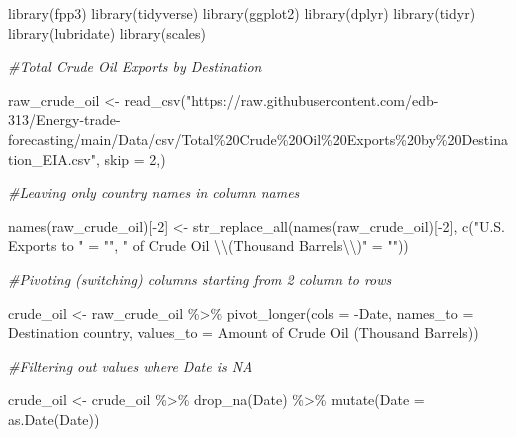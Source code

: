 \documentclass[
]{article}
\newenvironment{Shaded}{\begin{snugshade}}{\end{snugshade}}
\newcommand{\AttributeTok}[1]{\textcolor[rgb]{0.77,0.63,0.00}{#1}}
\newcommand{\CommentTok}[1]{\textcolor[rgb]{0.56,0.35,0.01}{\textit{#1}}}
\newcommand{\DecValTok}[1]{\textcolor[rgb]{0.00,0.00,0.81}{#1}}
\newcommand{\FunctionTok}[1]{\textcolor[rgb]{0.00,0.00,0.00}{#1}}
\newcommand{\NormalTok}[1]{#1}
\newcommand{\OtherTok}[1]{\textcolor[rgb]{0.56,0.35,0.01}{#1}}
\newcommand{\SpecialCharTok}[1]{\textcolor[rgb]{0.00,0.00,0.00}{#1}}
\newcommand{\StringTok}[1]{\textcolor[rgb]{0.31,0.60,0.02}{#1}}
\begin{document}
\begin{Shaded}
\begin{Highlighting}[]
\FunctionTok{library}\NormalTok{(fpp3)}
\FunctionTok{library}\NormalTok{(tidyverse)}
\FunctionTok{library}\NormalTok{(ggplot2)}
\FunctionTok{library}\NormalTok{(dplyr)}
\FunctionTok{library}\NormalTok{(tidyr)}
\FunctionTok{library}\NormalTok{(lubridate)}
\FunctionTok{library}\NormalTok{(scales)}

\CommentTok{\#Total Crude Oil Exports by Destination}


\NormalTok{raw\_crude\_oil }\OtherTok{\textless{}{-}} \FunctionTok{read\_csv}\NormalTok{(}\StringTok{"https://raw.githubusercontent.com/edb{-}313/Energy{-}trade{-}forecasting/main/Data/csv/Total\%20Crude\%20Oil\%20Exports\%20by\%20Destination\_EIA.csv"}\NormalTok{, }\AttributeTok{skip =} \DecValTok{2}\NormalTok{,)}


\CommentTok{\#Leaving only country names in column names}

\FunctionTok{names}\NormalTok{(raw\_crude\_oil)[}\SpecialCharTok{{-}}\DecValTok{2}\NormalTok{] }\OtherTok{\textless{}{-}} \FunctionTok{str\_replace\_all}\NormalTok{(}\FunctionTok{names}\NormalTok{(raw\_crude\_oil)[}\SpecialCharTok{{-}}\DecValTok{2}\NormalTok{],}
                                            \FunctionTok{c}\NormalTok{(}\StringTok{"U.S. Exports to "} \OtherTok{=} \StringTok{""}\NormalTok{,}
                                              \StringTok{" of Crude Oil }\SpecialCharTok{\textbackslash{}\textbackslash{}}\StringTok{(Thousand Barrels}\SpecialCharTok{\textbackslash{}\textbackslash{}}\StringTok{)"} \OtherTok{=} \StringTok{""}\NormalTok{))}

\CommentTok{\#Pivoting (switching) columns starting from 2 column to rows}

\NormalTok{crude\_oil }\OtherTok{\textless{}{-}}\NormalTok{ raw\_crude\_oil }\SpecialCharTok{\%\textgreater{}\%} 
  \FunctionTok{pivot\_longer}\NormalTok{(}\AttributeTok{cols =} \SpecialCharTok{{-}}\NormalTok{Date,}
               \AttributeTok{names\_to =} \StringTok{\textquotesingle{}Destination country\textquotesingle{}}\NormalTok{,}
               \AttributeTok{values\_to =} \StringTok{\textquotesingle{}Amount of Crude Oil (Thousand Barrels)\textquotesingle{}}\NormalTok{)}



\CommentTok{\#Filtering out values where Date is \textquotesingle{}NA\textquotesingle{}}

\NormalTok{crude\_oil }\OtherTok{\textless{}{-}}\NormalTok{ crude\_oil }\SpecialCharTok{\%\textgreater{}\%}
  \FunctionTok{drop\_na}\NormalTok{(Date) }\SpecialCharTok{\%\textgreater{}\%}
  \FunctionTok{mutate}\NormalTok{(}\AttributeTok{Date =} \FunctionTok{as.Date}\NormalTok{(Date))}


\end{Highlighting}
\end{Shaded}
\end{document}
